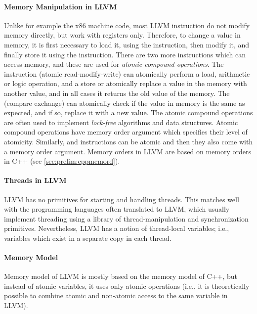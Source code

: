 \paragraph{Memory Manipulation in LLVM}
Unlike for example the x86 machine code, most LLVM instruction do not modify
memory directly, but work with registers only.
Therefore, to change a value in memory, it is first necessary to load it, using
the  instruction, then modify it, and finally store it using the
 instruction.
There are two more instructions which can access memory, and these are used for
\emph{atomic compound operations}.
The  instruction (atomic read-modify-write) can atomically
perform a load, arithmetic or logic operation, and a store or atomically
replace a value in the memory with another value, and in all cases it returns
the old value of the memory.
The  (compare exchange) can atomically check if the value in memory
is the same as expected, and if so, replace it with a new value.
The atomic compound operations are often used to implement \emph{lock-free}
algorithms and data structures.
Atomic compound operations have memory order argument which specifies their
level of atomicity.
Similarly,  and  instructions can be atomic and then they
also come with a memory order argument.
Memory orders in LLVM are based on memory orders in C++ (see
\autoref{sec:prelim:cppmemord}).

\paragraph{Threads in LLVM}

LLVM has no primitives for starting and handling threads.
This matches well with the programming languages often translated to LLVM,
which usually implement threading using a library of thread-manipulation and
synchronization primitives.
Nevertheless, LLVM has a notion of thread-local variables; i.e., variables
which exist in a separate copy in each thread.

\paragraph{Memory Model}

Memory model of LLVM is mostly based on the memory model of C++, but instead of
atomic variables, it uses only atomic operations (i.e., it is theoretically
possible to combine atomic and non-atomic access to the same variable in LLVM).

